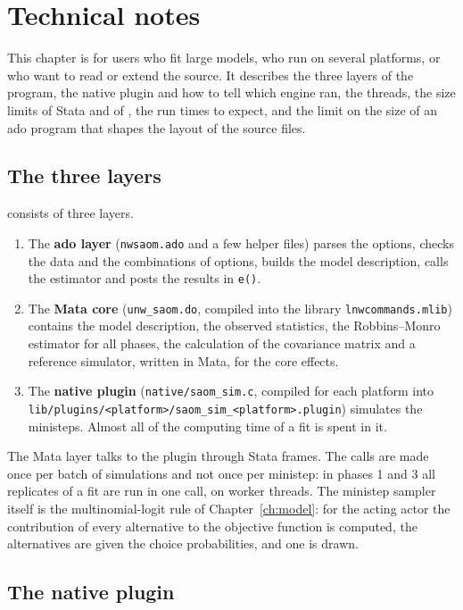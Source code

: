 \chapter{Technical notes}\label{ch:technical}

This chapter is for users who fit large models, who run \nwsaom{} on several platforms, or who want to read or extend the source. It describes the three layers of the program, the native plugin and how to tell which engine ran, the threads, the size limits of Stata and of \nwsaom, the run times to expect, and the limit on the size of an ado program that shapes the layout of the source files.

\section{The three layers}

\nwsaom{} consists of three layers.
\begin{enumerate}[nosep]
  \item The \textbf{ado layer} (\texttt{nwsaom.ado} and a few helper files) parses the options, checks the data and the combinations of options, builds the model description, calls the estimator and posts the results in \texttt{e()}.
  \item The \textbf{Mata core} (\texttt{unw\_saom.do}, compiled into the library \texttt{lnwcommands.mlib}) contains the model description, the observed statistics, the Robbins--Monro estimator for all phases, the calculation of the covariance matrix and a reference simulator, written in Mata, for the core effects.
  \item {\sloppy The \textbf{native plugin} (\texttt{native/saom\_sim.c}, compiled for each platform into \texttt{lib/plugins/<platform>/}\allowbreak\texttt{saom\_sim\_<platform>.plugin}) simulates the ministeps. Almost all of the computing time of a fit is spent in it.\par}
\end{enumerate}
The Mata layer talks to the plugin through Stata frames. The calls are made once per batch of simulations and not once per ministep: in phases 1 and 3 all replicates of a fit are run in one call, on worker threads. The ministep sampler itself is the multinomial-logit rule of Chapter~\ref{ch:model}: for the acting actor the contribution of every alternative to the objective function is computed, the alternatives are given the choice probabilities, and one is drawn.

\section{The native plugin}

